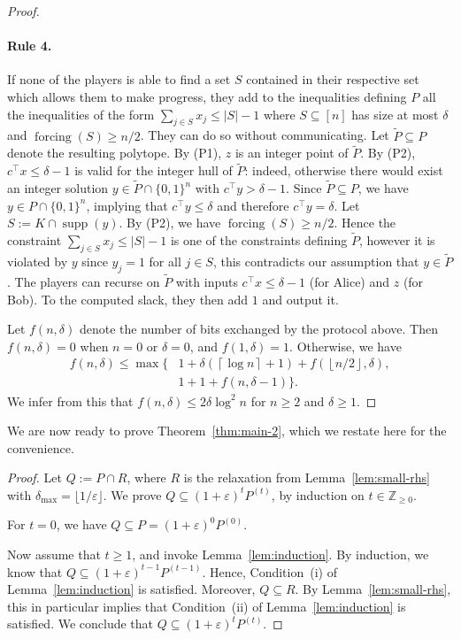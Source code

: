 \documentclass[11pt]{article}
\newcommand{\Z}{\mathbb{Z}}
\newcommand{\floor}[1]{\left\lfloor #1 \right\rfloor}
\newcommand{\ceil}[1]{\left\lceil #1 \right\rceil}
\DeclareMathOperator{\supp}{supp}
\DeclareMathOperator{\forcing}{forcing}
\newcommand{\eps}{\varepsilon}
\newcommand{\numrounds}{t}
\newcommand{\rhs}{\delta}
\newcommand{\lars}[1]{{\color{magenta}Lars: {#1} }}
\theoremstyle{remark}
\begin{document}
\begin{proof}
\paragraph{Rule 4.} If none of the players is able to find a set $S$ contained in their respective set which allows them to make progress, they add to the inequalities defining $P$ all the inequalities of the form $\sum_{j \in S} x_j \le |S| - 1$ where $S \subseteq [n]$ has size at most $\rhs$ and $\forcing(S) \ge n/2$. They can do so without communicating. Let $\tilde{P} \subseteq P$ denote the resulting polytope. By (P1), $z$ is an integer point of $\tilde{P}$. By (P2), $c^\intercal x \le \rhs - 1$ is valid for the integer hull of $\tilde{P}$: indeed, otherwise there would exist an integer solution $y \in \tilde{P} \cap \{0,1\}^n$ with $c^\intercal y > \rhs - 1$. Since $\tilde{P} \subseteq P$, we have $y \in P \cap \{0,1\}^n$, implying that $c^\intercal y \le \rhs$ and therefore $c^\intercal y = \rhs$. Let $S := K \cap \supp(y)$. By (P2), we have $\forcing(S) \ge n/2$. Hence the constraint $\sum_{j \in S} x_j \le |S| - 1$ is one of the constraints defining $\tilde{P}$, however it is violated by $y$ since $y_j = 1$ for all $j \in S$, this contradicts our assumption that $y \in \tilde{P}$. The players can recurse on $\tilde{P}$ with inputs $c^\intercal x \le \rhs - 1$ (for Alice) and $z$ (for Bob). To the computed slack, they then add $1$ and output it.

Let $f(n,\rhs)$ denote the number of bits exchanged by the protocol above. Then $f(n,\rhs) = 0$ when $n = 0$ or $\rhs = 0$, and $f(1,\rhs) = 1$. Otherwise, we have
%
\begin{align*}
f(n,\rhs) \le \max \{ &1 + \rhs (\ceil{\log n}+1) + f(\floor{n/2},\rhs),\\ 
       &1 + 1 + f(n,\rhs-1)\}.
\end{align*} 
%
We infer from this that $f(n,\rhs) \le 2 \rhs \log^2 n$ for $n \ge 2$ and $\rhs \ge 1$.
\end{proof}

We are now ready to prove Theorem~\ref{thm:main-2}, which we restate here for the convenience.

\ef*

\begin{proof}
	Let $Q := P \cap R$, where $R$ is the relaxation from Lemma~\ref{lem:small-rhs} with $\delta_{\max} = \lfloor 1/\eps \rfloor$. We prove $Q \subseteq (1+\eps)^{\numrounds} P^{(
\numrounds)}$, by induction on $t \in \Z_{\ge 0}$. 

For $t = 0$, we have $Q \subseteq P = (1+\eps)^0 P^{(0)}$.

Now assume that $\numrounds \ge 1$, and invoke Lemma~\ref{lem:induction}. By induction, we know that $Q \subseteq (1+\eps)^{\numrounds-1} P^{(
\numrounds-1)}$. Hence, Condition~(i) of Lemma~\ref{lem:induction} is satisfied. Moreover, $Q \subseteq R$. By Lemma~\ref{lem:small-rhs}, this in particular implies that Condition~(ii) of Lemma~\ref{lem:induction} is satisfied. We conclude that $Q \subseteq (1+\eps)^{\numrounds} P^{(\numrounds)}$.
\end{proof}
\end{document}
